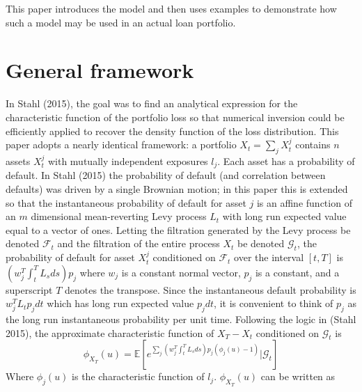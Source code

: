 \documentclass[12pt]{article}
\theoremstyle{definition}
\begin{document}
This paper introduces the model and then uses examples to demonstrate how such a model may be used in an actual loan portfolio.  
\section{General framework}
In Stahl (2015), the goal was to find an analytical expression for the characteristic function of the portfolio loss so that numerical inversion could be efficiently applied to recover the density function of the loss distribution.  This paper adopts a nearly identical framework: a portfolio \(X_t=\sum_j X_t ^ j\) contains \(n\) assets \(X_t ^ j\) with mutually independent exposures \(l_j\).  Each asset has a probability of default.  In Stahl (2015) the probability of default (and correlation between defaults) was driven by a single Brownian motion; in this paper this is extended so that the instantaneous probability of default for asset \(j\) is an affine function of an \(m\) dimensional mean-reverting Levy process \(L_t\) with long run expected value equal to a vector of ones.  Letting the filtration generated by the Levy process be denoted \(\mathcal{F}_t\) and the filtration of the entire process \(X_t\) be denoted \(\mathcal{G}_t\), the probability of default for asset \(X_t ^ j\) conditioned on \(\mathcal{F}_t\) over the interval \([t, T]\) is \(\left(w_j ^ T \int_t ^ T L_s ds  \right) p_j\) where \(w_j\) is a constant normal vector, \(p_j\) is a constant, and a superscript \(T\) denotes the transpose.  Since the instantaneous default probability is \(w_j ^T L_t p_j dt\) which has long run expected value \(p_j dt\),  it is convenient to think of \(p_j\) as the long run instantaneous probability per unit time.  Following the logic in (Stahl 2015), the approximate characteristic function of \(X_T-X_t\) conditioned on \(\mathcal{G}_t\) is 
\begin{equation}
\phi_{X_T}(u)=\mathbb{E}\left[e^{\sum_j \left(w_j ^T \int_t ^ T L_s  ds \right) p_j (\phi_j(u)-1)} |\mathcal{G}_t\right]
\end{equation}
Where \(\phi_j(u)\) is the characteristic function of \(l_j\).  \(\phi_{X_T}(u)\) can be written as 
\end{document}
